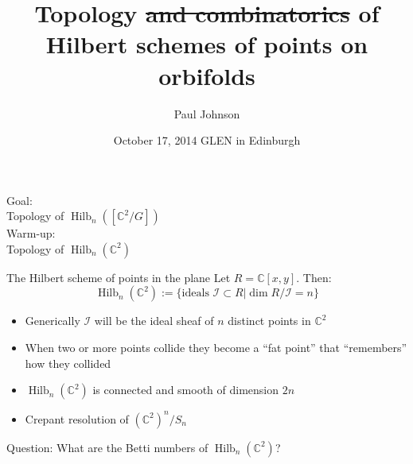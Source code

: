 \documentclass{beamer}
\DeclareMathOperator{\Hilb}{Hilb}
\newcommand{\C}{\mathbb{C}}
\begin{document}
\title{Topology \sout{and combinatorics} of Hilbert schemes of points on orbifolds }
\author{Paul Johnson}
\date{October 17, 2014 \@ GLEN in Edinburgh}



\newcommand{\stepright}[2]{%
\begin{scope}[xshift=#1cm,yshift=#2cm]
\clip (-.5, -.5)-- ++(1,1) -- ++(1,0) -- ++ (-1,-1) -- ++(-1,0);
\draw[cap=rect] (0,0)--(1,0);
\end{scope}
}
\newcommand{\stepdown}[2]{%
\begin{scope}[xshift=#1cm,yshift=#2cm]
\clip (-.5, -.5)-- ++(1,1) -- ++(0,-1) -- ++ (-1,-1) -- ++(0,1);
\draw[cap=rect] (0,0)--(0,-1);
\end{scope}
}




\begin{frame}[plain]
  \titlepage
\end{frame}


\begin{frame}[plain,c]

\begin{center}

\Huge
\alert{Goal:} \\ Topology of $\Hilb_n([\C^2/G])$ \\
\vspace{1cm}
{
Warm-up: } \\Topology of $\Hilb_n(\C^2)$

\end{center}

\end{frame}




\begin{frame}{The Hilbert scheme of points in the plane}
Let $R=\C[x,y]$.  Then:
$$\Hilb_n(\C^2):=\{\textrm{ideals }\mathcal{I}\subset R | \dim R/\mathcal{I}=n\}$$ 
\begin{itemize}
\item Generically $\mathcal{I}$ will be the ideal sheaf of $n$ distinct points in $\C^2$
\item When two or more points collide they become a ``fat point'' that ``remembers'' how they collided
\item $\Hilb_n(\C^2)$ is connected and smooth of dimension $2n$
\item Crepant resolution of $(\C^2)^n/S_n$
\end{itemize}

\begin{block}{Question: What are the Betti numbers of $\Hilb_n(\C^2)$?}
  
\end{block}

\end{frame}
\end{document}
